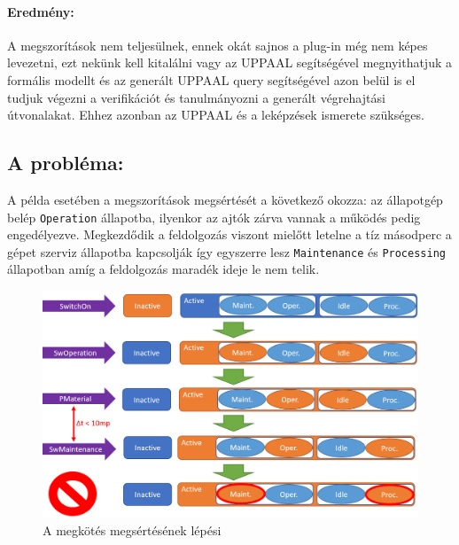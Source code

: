 \paragraph{Eredmény:} A megszorítások nem teljesülnek, ennek okát sajnos a plug-in még nem képes levezetni, ezt nekünk kell kitalálni vagy az UPPAAL segítségével megnyithatjuk a formális modellt és az generált UPPAAL query segítségével azon belül is el tudjuk végezni a verifikációt és tanulmányozni a generált végrehajtási útvonalakat. Ehhez azonban az UPPAAL és a leképzések ismerete szükséges.
\subsection{A probléma:} A példa esetében a megszorítások megsértését a következő okozza: az állapotgép belép \verb+Operation+ állapotba, ilyenkor az ajtók zárva vannak a működés pedig engedélyezve. Megkezdődik a feldolgozás viszont mielőtt letelne a tíz másodperc a gépet szerviz állapotba kapcsolják így egyszerre lesz \verb+Maintenance+ és \verb+Processing+ állapotban amíg a feldolgozás maradék ideje le nem telik.

\begin{figure}[H]
	\includegraphics[keepaspectratio, width=150mm]{figures/trace.png}
	\caption{A megkötés megsértésének lépési}
\end{figure}

